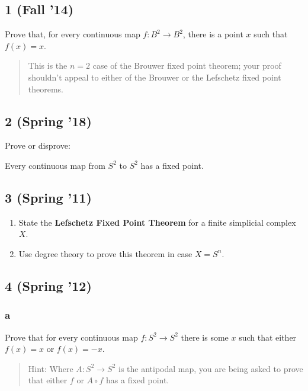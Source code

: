 \hypertarget{fall-14-7}{%
\subsection{1 (Fall '14)}\label{fall-14-7}}

Prove that, for every continuous map \(f : B^2 \to B^2\), there is a
point \(x\) such that \(f (x) = x\).

\begin{quote}
This is the \(n = 2\) case of the Brouwer fixed point theorem; your
proof shouldn't appeal to either of the Brouwer or the Lefschetz fixed
point theorems.
\end{quote}

\hypertarget{spring-18-4}{%
\subsection{2 (Spring '18)}\label{spring-18-4}}

Prove or disprove:

Every continuous map from \(S^2\) to \(S^2\) has a fixed point.

\hypertarget{spring-11-4}{%
\subsection{3 (Spring '11)}\label{spring-11-4}}

\begin{enumerate}
\def\labelenumi{\alph{enumi}.}
\item
  State the \textbf{Lefschetz Fixed Point Theorem} for a finite
  simplicial complex \(X\).
\item
  Use degree theory to prove this theorem in case \(X = S^n\).
\end{enumerate}

\hypertarget{spring-12-3}{%
\subsection{4 (Spring '12)}\label{spring-12-3}}

\hypertarget{a-5}{%
\subsubsection{a}\label{a-5}}

Prove that for every continuous map \(f : S^2 \to S^2\) there is some
\(x\) such that either \(f (x) = x\) or \(f (x) = -x\).

\begin{quote}
Hint: Where \(A : S^2 \to S^2\) is the antipodal map, you are being
asked to prove that either \(f\) or \(A \circ f\) has a fixed point.
\end{quote}

